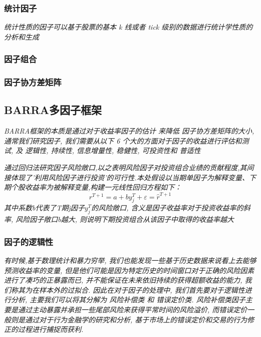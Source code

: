 \documentclass{scrartcl}
\numberwithin{equation}{section}
\begin{document}
\subsubsection{统计因子}

\textsl{统计性质的因子可以基于股票的基本 k 线或者 tick 级别的数据进行统计学性质的分析和生成
}
\subsubsection{因子组合}
\subsubsection{因子协方差矩阵}


\subsection{BARRA多因子框架}



\textsl{BARRA框架的本质是通过对于收益率因子的估计 来降低 因子协方差矩阵的大小, 通常我们研究因子, 我们需要从以下 6 个大的方面对于因子的收益进行评估和测试, 及 逻辑性, 持续性, 信息增量性, 稳健性, 可投资性和 普适性}

\textsl{通过回归法研究因子风险敞口,以之表明风险因子对投资组合业绩的贡献程度,其间接体现了'利用风险因子进行投资'的可行性.本处假设以当期单因子为解释变量、下期个股收益率为被解释变量,构建一元线性回归方程如下：}
$$ r^{T+1} = a + b y^{T}_j + \varepsilon = \hat{r}^{T+1} $$
\textsl{其中系数b代表了T期j因子$y^{T}_j$的风险敞口, 含义是因子收益率对于投资收益率的斜率, 风险因子敞口b越大, 则说明下期投资组合从该因子中取得的收益率越大
}
\subsubsection{因子的逻辑性}
\textsl{
    有时候,基于数理统计和暴力穷举, 我们也能发现一些基于历史数据来说看上去能够预测收益率的变量, 但是他们可能是因为特定历史的时间窗口对于正确的风险因素进行了凑巧的正暴露而已, 并不能保证在未来依旧持续的获得超额收益的能力, 我们称其为在样本外的过拟合. 因此在对于因子的处理中, 我们首先要对于逻辑性进行分析, 主要我们可以将其分解为 风险补偿类 和 错误定价类.  风险补偿类因子主要是通过主动暴露并承担一些尾部风险来获得平常时间的风险溢价, 而错误定价一般则是通过对于行为金融学的研究和分析, 基于市场上的错误定价和交易的行为修正的过程进行捕捉而获利. 
}
\end{document}
